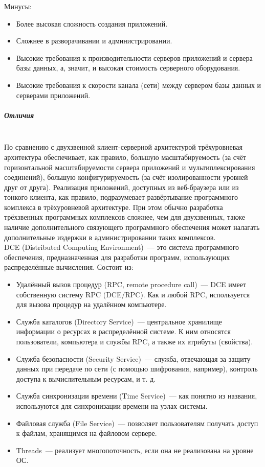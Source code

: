 Минусы:
\begin{itemize}
    \item Более высокая сложность создания приложений.
    \item Сложнее в разворачивании и администрировании.
    \item Высокие требования к производительности серверов приложений и сервера базы данных, а, значит, и высокая стоимость серверного оборудования.
    \item Высокие требования к скорости канала (сети) между сервером базы данных и серверами приложений.
\end{itemize}

\subparagraph{Отличия}~\\

По сравнению с двухзвенной клиент-серверной архитектурой трёхуровневая архитектура
обеспечивает, как правило, большую масштабируемость (за счёт горизонтальной
масштабируемости сервера приложений и мультиплексирования соединений), большую
конфигурируемость (за счёт изолированности уровней друг от друга). Реализация
приложений, доступных из веб-браузера или из тонкого клиента, как правило,
подразумевает развёртывание программного комплекса в трёхуровневой архитектуре. При
этом обычно разработка трёхзвенных программных комплексов сложнее, чем для
двухзвенных, также наличие дополнительного связующего программного обеспечения
может налагать дополнительные издержки в администрировании таких комплексов.~\\

DCE (Distributed Computing Environment)~--- это система программного обеспечения,
предназначенная для разработки программ, использующих распределённые вычисления. \autocite{dce}
Состоит из:
\begin{itemize}
    \item Удалённый вызов процедур (RPC, remote procedure call)~--- DCE имеет собственную систему RPC (DCE/RPC). Как и любой RPC, используется для вызова процедур на удалённом компьютере.
    \item Служба каталогов (Directory Service)~--- центральное хранилище информации о ресурсах в распределённой системе. К ним относятся пользователи, компьютера и службы RPC, а также их атрибуты (свойства).
    \item Служба безопасности (Security Service)~--- служба, отвечающая за защиту данных при передаче по сети (с помощью шифрования, например), контроль доступа к вычислительным ресурсам, и т. д.
    \item Служба синхронизации времени (Time Service)~--- как понятно из названия, используются для синхронизации времени на узлах системы.
    \item Файловая служба (File Service)~--- позволяет пользователям получать доступ к файлам, хранящимся на файловом сервере.
    \item Threads~--- реализует многопоточность, если она не реализована на уровне ОС.
\end{itemize}


